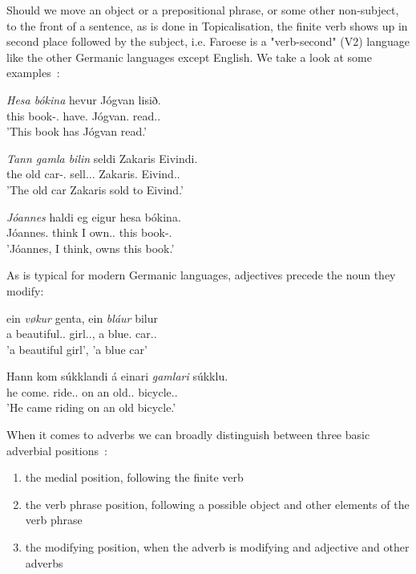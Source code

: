 \documentclass[12pt,%
]{lin-v2/lin}
\begin{document}
Should we move an object or a prepositional phrase, or some other non-subject, to the front of a sentence, as is done
in Topicalisation, the
finite verb shows up in second place followed by the subject, i.e. Faroese is a "verb-second" (V2) language like the
other Germanic languages except English. We take a look at some examples~\citep[238-239]{faroese}:
\begin{exe}
    \ex
    \begin{xlist}
        \item \gll \emph{Hesa bókina} hevur Jógvan lisið.\\
        {this book}-\Det.\Acc{} have.\Pst{} Jógvan.\Nom{} read.\Pst.\Ptcp{}\\
        \trans 'This book has Jógvan read.'
        \item \gll \emph{Tann gamla bilin} seldi Zakaris Eivindi.\\
        {the old car}-\Det.\Acc{} sell.\Third.\Sg.\Pst{} Zakaris.\Nom{} Eivind.\Dat.\\
        \trans 'The old car Zakaris sold to Eivind.'
        \item \gll \emph{Jóannes} haldi eg eigur hesa bókina.\\
        Jóannes.\Nom{} think I own.\Third\Sg.\Prs{} this book-\Det.\Acc\\
        \trans 'Jóannes, I think, owns this book.'
    \end{xlist}
\end{exe}

As is typical for modern Germanic languages, adjectives precede the noun they modify:
\begin{exe}
    \ex
    \begin{xlist}
        \item \gll ein \emph{vøkur} genta, ein \emph{bláur} bilur\\
        a beautiful.\Nom.\F{} girl.\Nom.\F{}, a blue\Nom.\M{} car.\Nom.\M{}\\
        \trans 'a beautiful girl', 'a blue car'
        \item \gll Hann kom súkklandi á einari \emph{gamlari} súkklu.\\
        he come.\Pst{} ride.\Prs.\Ptcp{} on an old.\Dat.\F{} bicycle.\Dat.\F{}\\
        \trans 'He came riding on an old bicycle.'
    \end{xlist}
\end{exe}

When it comes to adverbs we can broadly distinguish between three basic adverbial positions~\citep[241]{faroese}:
\begin{enumerate}
    \item the medial position, following the finite verb
    \item the verb phrase position, following a possible object and other elements of the verb phrase
    \item the modifying position, when the adverb is modifying and adjective and other adverbs
\end{enumerate}
\end{document}

